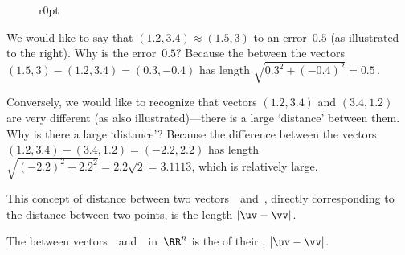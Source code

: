 \begin{wrapfigure}r{0pt}\end{wrapfigure}
\begin{example} 
We would like to say that \((1.2,3.4)\approx(1.5,3)\) to an error~\(0.5\) (as illustrated to the right).
Why is the error~\(0.5\)?  
Because the  between the vectors \((1.5,3)-(1.2,3.4)=(0.3,-0.4)\) has length \(\sqrt{0.3^2+(-0.4)^2}=0.5\)\,.

Conversely, we would like to recognize that vectors \((1.2,3.4)\) and \((3.4,1.2)\) are very different (as also illustrated)---there is a large `distance' between them.
Why is there a large `distance'?  Because the difference between the vectors \((1.2,3.4)-(3.4,1.2)=(-2.2,2.2)\) has length \(\sqrt{(-2.2)^2+2.2^2}=2.2\sqrt2=3.1113\), which is relatively large.
\end{example}

This concept of distance between two vectors~\uv\ and~\vv, directly corresponding to the distance between two points, is the length \(|\uv-\vv|\).

\begin{definition} \label{def:vecdist}
The  between vectors~\uv\ and~\vv\ in~\(\RR^n\) is the  of their , \(|\uv-\vv|\).
\end{definition}

